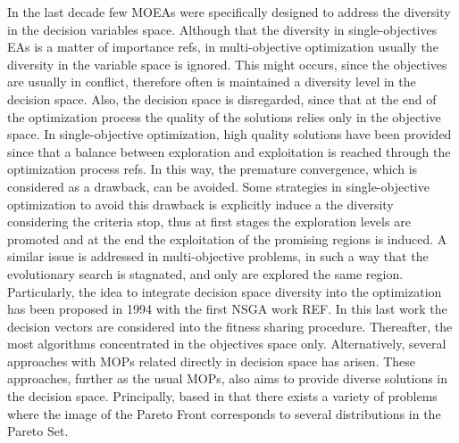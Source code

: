 In the last decade few MOEAs were specifically designed to address the diversity in the decision variables space.
%
Although that the diversity in single-objectives EAs is a matter of importance refs, in multi-objective optimization usually the diversity in the variable space is ignored.
%
This might occurs, since the objectives are usually in conflict, therefore often is maintained a diversity level in the decision space.
%
Also, the decision space is disregarded, since that at the end of the optimization process the quality of the solutions relies only in the objective space.
%
In single-objective optimization, high quality solutions have been provided since that a balance between exploration and exploitation is reached through the optimization process refs.
%
In this way, the premature convergence, which is considered as a drawback, can be avoided.
%
Some strategies in single-objective optimization to avoid this drawback is explicitly induce a the diversity considering the criteria stop, thus at first stages the exploration levels are promoted and at the end the exploitation of the promising regions is induced.
%
A similar issue is addressed in multi-objective problems, in such a way that the evolutionary search is stagnated, and only are explored the same region.
%
Particularly, the idea to integrate decision space diversity into the optimization has been proposed in 1994 with the first NSGA work REF.
%
In this last work the decision vectors are considered into the fitness sharing procedure.
%
Thereafter, the most algorithms concentrated in the objectives space only.
%
Alternatively, several approaches with MOPs related directly in decision space has arisen.
%
These approaches, further as the usual MOPs, also aims to provide diverse solutions in the decision space.
%
Principally, based in that there exists a variety of problems where the image of the Pareto Front corresponds to several distributions in the Pareto Set.
%

